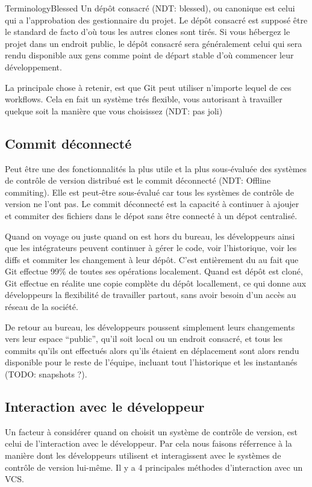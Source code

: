 \begin{callout}{Terminology}{Blessed}
Un dépôt consacré (NDT: blessed), ou canonique est celui qui a l'approbation des gestionnaire du projet.
Le dépôt consacré est supposé être le standard de facto d'où tous les autres clones sont tirés.
Si vous hébergez le projet dans un endroit public, le dépôt consacré sera généralement celui qui sera rendu disponible aux gens comme point
de départ stable d'où commencer leur développement.
\end{callout}

La principale chose à retenir, est que Git peut utiliser n'importe lequel de ces workflows.
Cela en fait un système trés flexible, vous autorisant à travailler quelque soit la manière que vous choisissez (NDT: pas joli)

\subsection{Commit déconnecté}
Peut être une des fonctionnalités la plus utile et la plus sous-évaluée des systèmes de contrôle de version distribué est le commit déconnecté (NDT: Offline commiting).
Elle est peut-être sous-évalué car tous les systèmes de contrôle de version ne l'ont pas.
Le commit déconnecté est la capacité à continuer à ajoujer et commiter des fichiers dans le dépot sans être connecté à un dépot centralisé.

Quand on voyage ou juste quand on est hors du bureau, les développeurs ainsi que les intégrateurs peuvent continuer à gérer le code, voir l'historique, voir les diffs et commiter les changement à leur dépôt.
C'est entièrement du au fait que Git effectue 99\% de toutes ses opérations localement.
Quand est dépôt est cloné, Git effectue en réalite une copie complète du dépôt locallement, ce qui donne aux développeurs la flexibilité de travailler partout, sans avoir besoin d'un accès au réseau de la société.

De retour au bureau, les développeurs poussent simplement leurs changements vers leur espace ``public'', qu'il soit local ou un endroit consacré, et tous les commits qu'ils ont effectués alors qu'ils étaient en déplacement sont alors rendu disponible pour le reste de l'équipe, incluant tout l'historique et les instantanés (TODO: snapshots ?).

\subsection{Interaction avec le développeur}
Un facteur à considérer quand on choisit un système de contrôle de version, est celui de l'interaction avec le développeur.
Par cela nous faisons réferrence à la manière dont les développeurs utilisent et interagissent avec le systèmes de contrôle de version lui-même.
Il y a 4 principales méthodes d'interaction avec un VCS.

